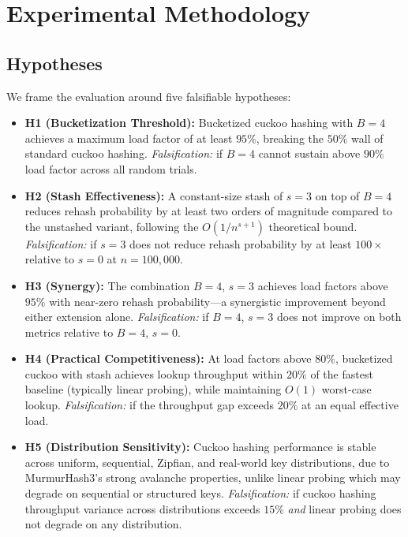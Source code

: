 \documentclass[10pt,journal,compsoc]{IEEEtran}
\begin{document}
\section{Experimental Methodology}\label{sec:methodology}

\subsection{Hypotheses}\label{sec:hypotheses}
We frame the evaluation around five falsifiable hypotheses:

\begin{itemize}
\item \textbf{H1 (Bucketization Threshold):} Bucketized cuckoo hashing with $B=4$ achieves a maximum load factor of at least $95\%$, breaking the $50\%$ wall of standard cuckoo hashing. \emph{Falsification:} if $B=4$ cannot sustain above $90\%$ load factor across all random trials.

\item \textbf{H2 (Stash Effectiveness):} A constant-size stash of $s=3$ on top of $B=4$ reduces rehash probability by at least two orders of magnitude compared to the unstashed variant, following the $O(1/n^{s+1})$ theoretical bound. \emph{Falsification:} if $s=3$ does not reduce rehash probability by at least $100\times$ relative to $s=0$ at $n=100{,}000$.

\item \textbf{H3 (Synergy):} The combination $B=4$, $s=3$ achieves load factors above $95\%$ with near-zero rehash probability---a synergistic improvement beyond either extension alone. \emph{Falsification:} if $B{=}4$, $s{=}3$ does not improve on both metrics relative to $B{=}4$, $s{=}0$.

\item \textbf{H4 (Practical Competitiveness):} At load factors above $80\%$, bucketized cuckoo with stash achieves lookup throughput within $20\%$ of the fastest baseline (typically linear probing), while maintaining $O(1)$ worst-case lookup. \emph{Falsification:} if the throughput gap exceeds $20\%$ at an equal effective load.

\item \textbf{H5 (Distribution Sensitivity):} Cuckoo hashing performance is stable across uniform, sequential, Zipfian, and real-world key distributions, due to MurmurHash3's strong avalanche properties, unlike linear probing which may degrade on sequential or structured keys. \emph{Falsification:} if cuckoo hashing throughput variance across distributions exceeds $15\%$ \emph{and} linear probing does not degrade on any distribution.
\end{itemize}
\end{document}
